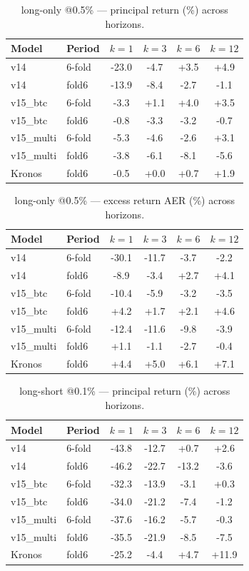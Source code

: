 \documentclass[11pt]{article}
\begin{document}
\begin{table}[h]\centering
\caption{long-only @0.5\% --- principal return (\%) across horizons.}
\label{tab:loret}
\begin{tabular}{ll cccc}
\toprule
Model & Period & $k{=}1$ & $k{=}3$ & $k{=}6$ & $k{=}12$ \\
\midrule
v14 & 6-fold & -23.0 & -4.7 & +3.5 & +4.9 \\
v14 & fold6 & -13.9 & -8.4 & -2.7 & -1.1 \\
v15\_btc & 6-fold & -3.3 & +1.1 & +4.0 & +3.5 \\
v15\_btc & fold6 & -0.8 & -3.3 & -3.2 & -0.7 \\
v15\_multi & 6-fold & -5.3 & -4.6 & -2.6 & +3.1 \\
v15\_multi & fold6 & -3.8 & -6.1 & -8.1 & -5.6 \\
Kronos & fold6 & -0.5 & +0.0 & +0.7 & +1.9 \\
\bottomrule\end{tabular}\end{table}
\begin{table}[h]\centering
\caption{long-only @0.5\% --- excess return AER (\%) across horizons.}
\label{tab:loaer}
\begin{tabular}{ll cccc}
\toprule
Model & Period & $k{=}1$ & $k{=}3$ & $k{=}6$ & $k{=}12$ \\
\midrule
v14 & 6-fold & -30.1 & -11.7 & -3.7 & -2.2 \\
v14 & fold6 & -8.9 & -3.4 & +2.7 & +4.1 \\
v15\_btc & 6-fold & -10.4 & -5.9 & -3.2 & -3.5 \\
v15\_btc & fold6 & +4.2 & +1.7 & +2.1 & +4.6 \\
v15\_multi & 6-fold & -12.4 & -11.6 & -9.8 & -3.9 \\
v15\_multi & fold6 & +1.1 & -1.1 & -2.7 & -0.4 \\
Kronos & fold6 & +4.4 & +5.0 & +6.1 & +7.1 \\
\bottomrule\end{tabular}\end{table}
\begin{table}[h]\centering
\caption{long-short @0.1\% --- principal return (\%) across horizons.}
\label{tab:lsret}
\begin{tabular}{ll cccc}
\toprule
Model & Period & $k{=}1$ & $k{=}3$ & $k{=}6$ & $k{=}12$ \\
\midrule
v14 & 6-fold & -43.8 & -12.7 & +0.7 & +2.6 \\
v14 & fold6 & -46.2 & -22.7 & -13.2 & -3.6 \\
v15\_btc & 6-fold & -32.3 & -13.9 & -3.1 & +0.3 \\
v15\_btc & fold6 & -34.0 & -21.2 & -7.4 & -1.2 \\
v15\_multi & 6-fold & -37.6 & -16.2 & -5.7 & -0.3 \\
v15\_multi & fold6 & -35.5 & -21.9 & -8.5 & -7.5 \\
Kronos & fold6 & -25.2 & -4.4 & +4.7 & +11.9 \\
\bottomrule\end{tabular}\end{table}
\end{document}
